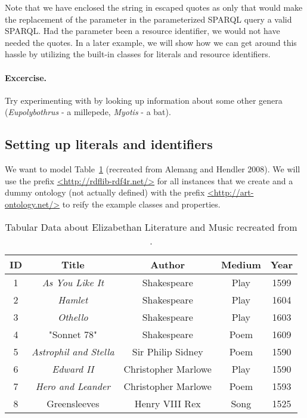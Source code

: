 Note that we have enclosed the string  in escaped quotes as only that would make the replacement of the parameter in the parameterized SPARQL query a valid SPARQL. Had the parameter been a resource identifier, we would not have needed the quotes. In a later example, we will show how we can get around this hassle by utilizing the built-in classes for literals and resource identifiers.

\paragraph{Excercise.} Try experimenting with  by looking up information about some other genera (\emph{Eupolybothrus} - a millepede, \emph{Myotis} - a bat).

\subsection{Setting up literals and identifiers}

We want to model Table~\ref{table:classical-works} (recreated from Alemang and Hendler 2008). We will use the prefix \url{<http://rdflib-rdf4r.net/>} for all instances that we create and a dummy ontology (not actually defined) with the prefix \url{<http://art-ontology.net/>} to reify the example classes and properties.

\begin{table}[h!]
\caption{Tabular Data about Elizabethan Literature and Music recreated from \cite{allemang_semantic_2011}.}
\begin{tabular}{ccccc}
\hline
 ID & Title                       & Author            & Medium & Year\\  \hline
 1  & \emph{As You Like It}       & Shakespeare       & Play & 1599\\
 2  & \emph{Hamlet}               & Shakespeare       & Play & 1604\\
 3  & \emph{Othello}              & Shakespeare       & Play & 1603\\
 4  & "Sonnet 78"                 & Shakespeare       & Poem & 1609\\
 5  & \emph{Astrophil and Stella} & Sir Philip Sidney & Poem & 1590\\
 6  & \emph{Edward II}            & Christopher Marlowe  & Play & 1590\\
 7  & \emph{Hero and Leander}     & Christopher Marlowe  & Poem & 1593\\
 8  & Greensleeves                & Henry VIII Rex       & Song & 1525
\end{tabular}
\label{table:classical-works}
\end{table}

